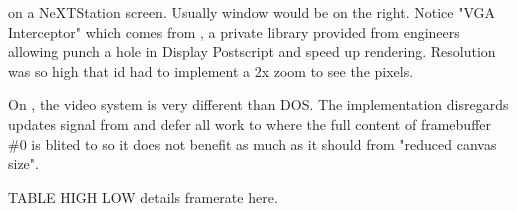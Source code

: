 \doom{}on a NeXTStation screen. Usually  window would be on the right. Notice "VGA Interceptor" which comes from , a private library provided from \NeXT engineers allowing punch a hole in Display Postscript and speed up rendering. Resolution was so high that id had to implement a 2x zoom to see the pixels.\\
\par
{}

\vspace{-4mm}
On \NeXT, the video system is very different than DOS. The implementation disregards updates signal from  and defer all work to  where the full content of framebuffer \#0 is blited to  so it does not benefit as much as it should from "reduced canvas size".\\
\par
TABLE HIGH LOW details framerate here.
